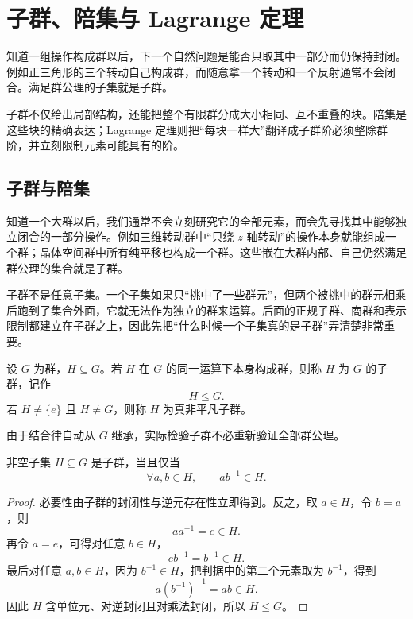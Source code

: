 \section{子群、陪集与 Lagrange 定理}

知道一组操作构成群以后，下一个自然问题是能否只取其中一部分而仍保持封闭。例如正三角形的三个转动自己构成群，而随意拿一个转动和一个反射通常不会闭合。满足群公理的子集就是子群。

子群不仅给出局部结构，还能把整个有限群分成大小相同、互不重叠的块。陪集是这些块的精确表达；Lagrange 定理则把“每块一样大”翻译成子群阶必须整除群阶，并立刻限制元素可能具有的阶。

\subsection{子群与陪集}
\label{sec:subgroups-cosets}

知道一个大群以后，我们通常不会立刻研究它的全部元素，而会先寻找其中能够独立闭合的一部分操作。例如三维转动群中“只绕 $z$ 轴转动”的操作本身就能组成一个群；晶体空间群中所有纯平移也构成一个群。这些嵌在大群内部、自己仍然满足群公理的集合就是子群。

子群不是任意子集。一个子集如果只“挑中了一些群元”，但两个被挑中的群元相乘后跑到了集合外面，它就无法作为独立的群来运算。后面的正规子群、商群和表示限制都建立在子群之上，因此先把“什么时候一个子集真的是子群”弄清楚非常重要。


\begin{definition}[子群]
设 $G$ 为群，$H\subseteq G$。若 $H$ 在 $G$ 的同一运算下本身构成群，则称 $H$ 为 $G$ 的子群，记作
\[
H\leqslant G.
\]
若 $H\neq\{e\}$ 且 $H\neq G$，则称 $H$ 为真非平凡子群。
\label{def:subgroup}
\end{definition}

由于结合律自动从 $G$ 继承，实际检验子群不必重新验证全部群公理。

\begin{theorem}[一步子群判据]
非空子集 $H\subseteq G$ 是子群，当且仅当
\[
\forall a,b\in H,
\qquad
ab^{-1}\in H.
\]
\label{thm:one-step-subgroup-test}

\end{theorem}

\begin{proof}
必要性由子群的封闭性与逆元存在性立即得到。反之，取 $a\in H$，令 $b=a$，则
\[
aa^{-1}=e\in H.
\]
再令 $a=e$，可得对任意 $b\in H$，
\[
eb^{-1}=b^{-1}\in H.
\]
最后对任意 $a,b\in H$，因为 $b^{-1}\in H$，把判据中的第二个元素取为 $b^{-1}$，得到
\[
a(b^{-1})^{-1}=ab\in H.
\]
因此 $H$ 含单位元、对逆封闭且对乘法封闭，所以 $H\leqslant G$。
\end{proof}

